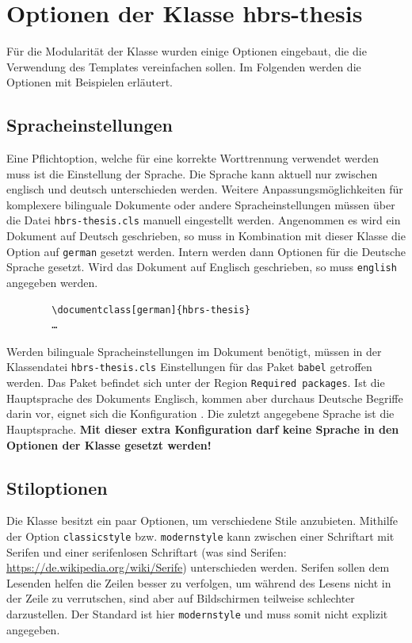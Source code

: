 \chapter{Optionen der Klasse hbrs-thesis}
\label{chap:klassenoptionen}
Für die Modularität der Klasse wurden einige Optionen eingebaut, die die Verwendung des Templates vereinfachen sollen. Im Folgenden werden die Optionen mit Beispielen erläutert.

\section{Spracheinstellungen}
Eine Pflichtoption, welche für eine korrekte Worttrennung verwendet werden muss ist die Einstellung der Sprache. Die Sprache kann aktuell nur zwischen englisch und deutsch unterschieden werden. Weitere Anpassungsmöglichkeiten für komplexere bilinguale Dokumente oder andere Spracheinstellungen müssen über die Datei \texttt{hbrs-thesis.cls} manuell eingestellt werden. Angenommen es wird ein Dokument auf Deutsch geschrieben, so muss in Kombination mit dieser Klasse die Option auf \texttt{german} gesetzt werden. Intern werden dann Optionen für die Deutsche Sprache gesetzt. Wird das Dokument auf Englisch geschrieben, so muss \texttt{english} angegeben werden. 

\begin{cde}
    \begin{verbatim}
        \documentclass[german]{hbrs-thesis}
        …
    \end{verbatim}
\end{cde}

Werden bilinguale Spracheinstellungen im Dokument benötigt, müssen in der Klassendatei \texttt{hbrs-thesis.cls} Einstellungen für das Paket \texttt{babel} getroffen werden. Das Paket befindet sich unter der Region \texttt{Required packages}. Ist die Hauptsprache des Dokuments Englisch, kommen aber durchaus Deutsche Begriffe darin vor, eignet sich die Konfiguration \texttt{}. Die zuletzt angegebene Sprache ist die Hauptsprache. \textbf{Mit dieser extra Konfiguration darf keine Sprache in den Optionen der Klasse gesetzt werden!}

\section{Stiloptionen}
Die Klasse besitzt ein paar Optionen, um verschiedene Stile anzubieten. Mithilfe der Option \texttt{classicstyle} bzw. \texttt{modernstyle} kann zwischen einer Schriftart mit Serifen und einer serifenlosen Schriftart (was sind Serifen: \url{https://de.wikipedia.org/wiki/Serife}) unterschieden werden. Serifen sollen dem Lesenden helfen die Zeilen besser zu verfolgen, um während des Lesens nicht in der Zeile zu verrutschen, sind aber auf Bildschirmen teilweise schlechter darzustellen. Der Standard ist hier \texttt{modernstyle} und muss somit nicht explizit angegeben.

